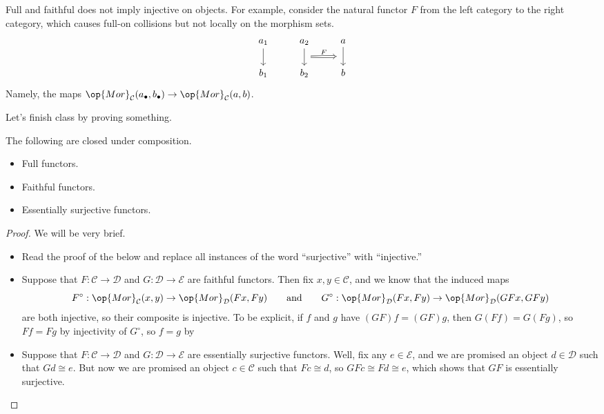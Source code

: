 \begin{example}
	Full and faithful does not imply injective on objects. For example, consider the natural functor $F$ from the left category to the right category, which causes full-on collisions but not locally on the morphism sets.
	\[\begin{tikzcd}
		{a_1} & {a_2} & a \\
		{b_1} & {b_2} & b
		\arrow[from=1-1, to=2-1]
		\arrow[""{name=0, anchor=center, inner sep=0}, from=1-2, to=2-2]
		\arrow[""{name=1, anchor=center, inner sep=0}, from=1-3, to=2-3]
		\arrow["F", shorten <=6pt, shorten >=6pt, Rightarrow, from=0, to=1]
	\end{tikzcd}\]
	Namely, the maps $\op{Mor}_\mathcal C(a_\bullet,b_\bullet)\to\op{Mor}_\mathcal C(a,b)$.
\end{example}
Let's finish class by proving something.
\begin{prop}
	The following are closed under composition.
	\begin{itemize}
		\item Full functors.
		\item Faithful functors.
		\item Essentially surjective functors.
	\end{itemize}
\end{prop}
\begin{proof}
	We will be very brief.
	\begin{itemize}
		\item Read the proof of the below and replace all instances of the word ``surjective'' with ``injective.''
		\item Suppose that $F:\mathcal C\to\mathcal D$ and $G:\mathcal D\to\mathcal E$ are faithful functors. Then fix $x,y\in\mathcal C$, and we know that the induced maps
		\[F^\circ:\op{Mor}_\mathcal C(x,y)\to\op{Mor}_\mathcal D(Fx,Fy)\qquad\text{and}\qquad G^\circ:\op{Mor}_\mathcal D(Fx,Fy)\to\op{Mor}_\mathcal D(GFx,GFy)\]
		are both injective, so their composite is injective. To be explicit, if $f$ and $g$ have $(GF)f=(GF)g$, then $G(Ff)=G(Fg)$, so $Ff=Fg$ by injectivity of $G^\circ$, so $f=g$ by 
		\item Suppose that $F:\mathcal C\to\mathcal D$ and $G:\mathcal D\to\mathcal E$ are essentially surjective functors. Well, fix any $e\in\mathcal E$, and we are promised an object $d\in\mathcal D$ such that $Gd\cong e$. But now we are promised an object $c\in\mathcal C$ such that $Fc\cong d$, so $GFc\cong Fd\cong e$, which shows that $GF$ is essentially surjective.
		\qedhere
	\end{itemize}
\end{proof}